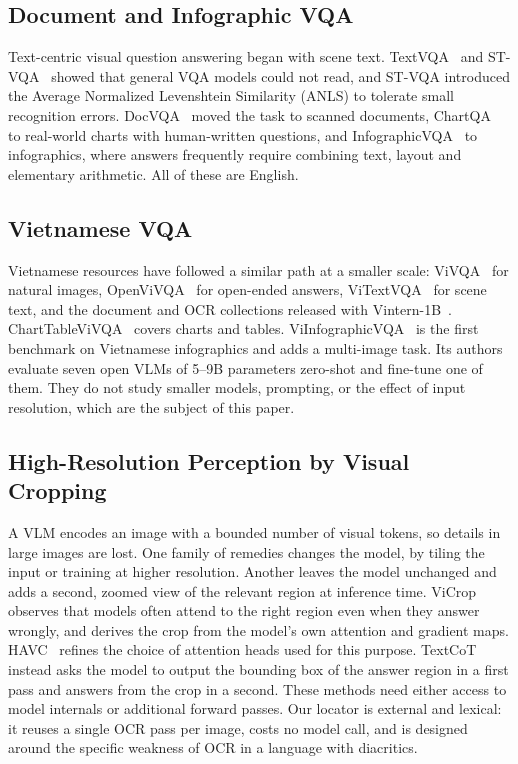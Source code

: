 \documentclass[conference]{IEEEtran}
\begin{document}
\subsection{Document and Infographic VQA}
Text-centric visual question answering began with scene text. TextVQA~\cite{textvqa} and ST-VQA~\cite{stvqa} showed that general VQA models could not read, and ST-VQA introduced the Average Normalized Levenshtein Similarity (ANLS) to tolerate small recognition errors. DocVQA~\cite{docvqa} moved the task to scanned documents, ChartQA~\cite{chartqa} to real-world charts with human-written questions, and InfographicVQA~\cite{infographicvqa} to infographics, where answers frequently require combining text, layout and elementary arithmetic. All of these are English.

\subsection{Vietnamese VQA}
Vietnamese resources have followed a similar path at a smaller scale: ViVQA~\cite{vivqa} for natural images, OpenViVQA~\cite{openvivqa} for open-ended answers, ViTextVQA~\cite{vitextvqa} for scene text, and the document and OCR collections released with Vintern-1B~\cite{vintern}. ChartTableViVQA~\cite{charttablevivqa} covers charts and tables. ViInfographicVQA~\cite{viinfographicvqa} is the first benchmark on Vietnamese infographics and adds a multi-image task. Its authors evaluate seven open VLMs of 5--9B parameters zero-shot and fine-tune one of them. They do not study smaller models, prompting, or the effect of input resolution, which are the subject of this paper.

\subsection{High-Resolution Perception by Visual Cropping}
A VLM encodes an image with a bounded number of visual tokens, so details in large images are lost. One family of remedies changes the model, by tiling the input or training at higher resolution. Another leaves the model unchanged and adds a second, zoomed view of the relevant region at inference time. ViCrop~\cite{vicrop} observes that models often attend to the right region even when they answer wrongly, and derives the crop from the model's own attention and gradient maps. HAVC~\cite{havc} refines the choice of attention heads used for this purpose. TextCoT~\cite{textcot} instead asks the model to output the bounding box of the answer region in a first pass and answers from the crop in a second. These methods need either access to model internals or additional forward passes. Our locator is external and lexical: it reuses a single OCR pass per image, costs no model call, and is designed around the specific weakness of OCR in a language with diacritics.
\end{document}
